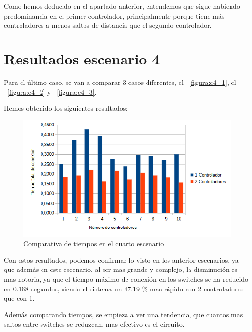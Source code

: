 \documentclass[a4paper, 12pt]{book}
\begin{document}
	Como hemos deducido en el apartado anterior, entendemos que sigue habiendo predominancia en el primer controlador, principalmente porque tiene más controladores a menos saltos de distancia que el segundo controlador. 
	
	\section{Resultados escenario 4} 
	\label{sec:resultEsc4}
	
	
	Para el último caso, se van a comparar 3 casos diferentes, el ~\ref{figura:e4_1}, el ~\ref{figura:e4_2} y ~\ref{figura:e4_3}. 
	
	
	Hemos obtenido los siguientes resultados:
	
	\begin{figure}[H]
		\centering
		\includegraphics[width=16cm, keepaspectratio]{img/comparativaescenario4}
		\caption{Comparativa de tiempos en el cuarto escenario}
		\label{figura:comparativaescenario4}
	\end{figure}
	
	Con estos resultados, podemos confirmar lo visto en los anterior escenarios, ya que además en este escenario, al ser mas grande y complejo, la disminución es mas notoria, ya que el tiempo máximo de conexión en los switches se ha reducido en 0.168 segundos, siendo el sistema un 47.19 \% mas rápido con 2 controladores que con 1.
	
	Además comparando tiempos, se empieza a ver una tendencia, que cuantos mas saltos entre switches se reduzcan, mas efectivo es el circuito.
	
\end{document}
